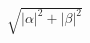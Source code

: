 \documentclass[preview]{standalone}
\begin{document}
\begin{center}
$\sqrt{|\alpha|^2 + |\beta|^2}$
\end{center}
\end{document}
